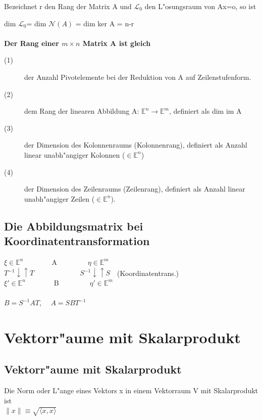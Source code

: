 \documentclass[10pt, a4paper, twocolumn]{scrartcl}
\begin{document}
Bezeichnet r den Rang der Matrix A und $\mathcal{L}_0$ den L"osungsraum von Ax=o, so ist

dim $\mathcal{L}_0$= dim $\mathcal{N}(A)$ = dim ker A = n-r\\\\

{\bf Der Rang einer $m \times n$ Matrix A ist gleich}\\
\begin{description}
 \item[(1)] der Anzahl Pivotelemente bei der Reduktion von A auf Zeilenstufenform.
 \item[(2)] dem Rang der linearen Abbildung A: $\mathbb{E}^n\rightarrow\mathbb{E}^m$, definiert als dim im A
 \item[(3)] der Dimension des Kolonnenraums (Kolonnenrang), definiert als Anzahl linear unabh"angiger Kolonnen ($\in \mathbb{E}^n$)
 \item[(4)] der Dimension des Zeilenraums (Zeilenrang), definiert als Anzahl linear unabh"angiger Zeilen ($\in \mathbb{E}^n$).
\end{description}

\subsection{Die Abbildungsmatrix bei Koordinatentransformation}

$\xi \in \mathbb{E}^n$\ \ \ \ \ \ \ \ A \ \ \ \ \ \ \ \ $\eta \in \mathbb{E}^m$\\
$T^{-1}\downarrow\uparrow T$\ \ \ \ \ \ \ \ \ \ \ \ \ $S^{-1}\downarrow \uparrow S$\ \ (Koordinatentrans.)\\
$\xi' \in \mathbb{E}^n$\ \ \ \ \ \ \ \ B \ \ \ \ \ \ \ \ $\eta' \in \mathbb{E}^m$\\\\

$B=S^{-1}AT$, \ \ $A=SBT^{-1}$\\

\section{Vektorr"aume mit Skalarprodukt}


\subsection{Vektorr"aume mit Skalarprodukt}

Die Norm oder L"ange eines Vektors x in einem Vektorraum V mit Skalarprodukt ist\\
$\|x\|\equiv\sqrt{\langle x,x \rangle}$\\\\
\end{document}
